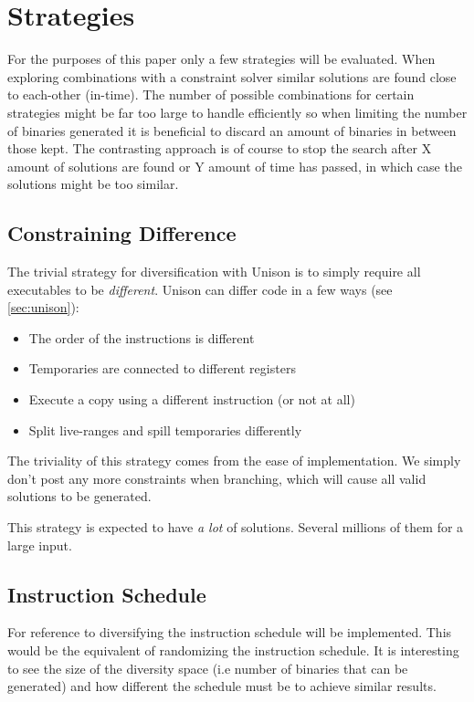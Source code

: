 \section{Strategies}

For the purposes of this paper only a few strategies will be evaluated. When exploring
combinations with a constraint solver similar solutions are found close to each-other (in-time).
The number of possible combinations for certain strategies might be far too large to handle
efficiently so when limiting the number of binaries generated it is beneficial to discard
an amount of binaries in between those kept. The contrasting approach is of course to stop
the search after X amount of solutions are found or Y amount of time has passed, in which
case the solutions might be too similar.


\subsection{Constraining Difference}

The trivial strategy for diversification with Unison is to simply require all executables
to be \textit{different}. Unison can differ code in a few ways (see \ref{sec:unison}):

\begin{itemize}
	\item The order of the instructions is different
	\item Temporaries are connected to different registers
	\item Execute a copy using a different instruction (or not at all)
	\item Split live-ranges and spill temporaries differently
\end{itemize}

The triviality of this strategy comes from the ease of implementation. We simply don't post
any more constraints when branching, which will cause all valid solutions to be generated.

This strategy is expected to have \textit{a lot} of solutions. Several millions of them
for a large input.

\subsection{Instruction Schedule}

For reference to \textcite{large-scale-automated} diversifying the instruction schedule will
be implemented. This would be the equivalent of randomizing the instruction schedule. It is
interesting to see the size of the diversity space (i.e number of binaries that can be
generated) and how different the schedule must be to achieve similar results.

